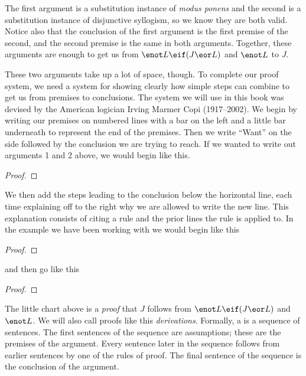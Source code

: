 The first argument is a substitution instance of \emph{modus ponens} and the second is a substitution instance of disjunctive syllogism, so we know they are both valid. Notice also that the conclusion of the first argument is the first premise of the second, and the second premise is the same in both arguments. Together, these arguments are enough to get us from $\enot L \eif (J \eor L)$ and $\enot L$ to $J$.

These two arguments take up a lot of space, though. To complete our proof system, we need a system for showing clearly how simple steps can combine to get us from premises to conclusions. The system we will use in this book was devised by the American logician Irving Marmer Copi (1917--2002). We begin by writing our premises on numbered lines with a bar on the left and a little bar underneath to represent the end of the premises. Then we write ``Want'' on the side followed by the conclusion we are trying to reach. If we wanted to write out arguments 1 and 2 above, we would begin like this.

\begin{proof}
	 			
\end{proof}

We then add the steps leading to the conclusion below the horizontal line, each time explaining off to the right why we are allowed to write the new line. This explanation consists of citing a rule and the prior lines the rule is applied to. In the example we have been working with we would begin like this

\begin{proof}
	 
	 
\end{proof}

and then go like this

\begin{proof}
	 
	 
	 
\end{proof}

The little chart above is a \emph{proof} that $J$ follows from $\enot L \eif (J \eor L)$ and $\enot L$. We will also call proofs like this \emph{derivations}. Formally, a  is a sequence of sentences. The first sentences of the sequence are assumptions; these are the premises of the argument. Every sentence later in the sequence follows from earlier sentences by one of the rules of proof. The final sentence of the sequence is the conclusion of the argument.

